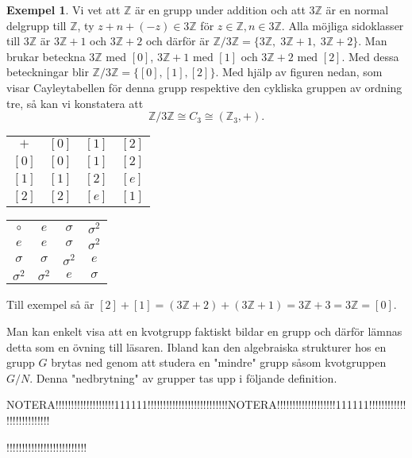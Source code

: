 \documentclass{article}
\theoremstyle{definition}
\newtheorem{exmp}[thm]{Exempel}
\begin{document}
\begin{exmp}
  Vi vet att $\mathbb{Z}$ är en grupp under addition och att $3 \mathbb{Z}$ är en normal delgrupp till $\mathbb{Z}$, ty $z + n + (-z) \in 3 \mathbb{Z}$
  för $z \in \mathbb{Z}, n \in 3 \mathbb{Z}$. Alla möjliga sidoklasser till $3 \mathbb{Z}$ är $3 \mathbb{Z} + 1$ och $3 \mathbb{Z} + 2$ och därför är 
  $\mathbb{Z} / 3\mathbb{Z} = \{3 \mathbb{Z}, \; 3 \mathbb{Z} + 1, \; 3 \mathbb{Z} + 2\}$. Man brukar beteckna $3 \mathbb{Z}$ med $[0]$, 
  $3 \mathbb{Z} + 1$ med $[1]$ och $3 \mathbb{Z} + 2$ med $[2]$. Med dessa beteckningar blir $\mathbb{Z} / 3\mathbb{Z} = \{[0], [1], [2]\}$. 
  Med hjälp av figuren 
  nedan, som visar Cayleytabellen för denna grupp respektive den cykliska gruppen av ordning tre, så kan vi konstatera att
  \[\mathbb{Z} / 3\mathbb{Z} \cong C_3 \cong (\mathbb{Z}_3, +).\]
  \begin{center}
    \begin{tabular}{c | c c c}
      $+$ & $[0]$ & $[1]$ & $[2]$  \\
      \cline{1-4}
      $[0]$ & $[0]$ & $[1]$ & $[2]$ \\
      $[1]$ & $[1]$  & $[2]$ & $[e]$\\
      $[2]$ & $[2]$ & $[e]$  & $[1]$\\
    \end{tabular} 
    \qquad
    \begin{tabular}{c | c c c}
      $\circ$ & $e$ & $\sigma$ & $\sigma^2$ \\
      \cline{1-4}
      $e$ & $e$ & $\sigma$ & $\sigma^2$ \\
      $\sigma$ & $\sigma$ & $\sigma^2$  & $e$\\
      $\sigma^2$ & $\sigma^2$ & $e$ & $\sigma$
    \end{tabular}
  \end{center}
  Till exempel så är $[2] + [1] = (3 \mathbb{Z} + 2) + (3 \mathbb{Z} + 1) = 3\mathbb{Z} + 3 = 3 \mathbb{Z} = [0].$
\end{exmp}
Man kan enkelt visa att en kvotgrupp faktiskt bildar en grupp och därför lämnas detta som en övning till läsaren. Ibland kan den 
algebraiska strukturer hos en grupp $G$ brytas ned genom att studera en "mindre" grupp såsom kvotgruppen $G/N$. Denna "nedbrytning"
av grupper tas upp i följande definition.

NOTERA!!!!!!!!!!!!!!!!!!!111111!!!!!!!!!!!!!!!!!!!!!!!!!!NOTERA!!!!!!!!!!!!!!!!!!!111111!!!!!!!!!!!!!!!!!!!!!!!!!!


!!!!!!!!!!!!!!!!!!!!!!!!!!
\end{document}
